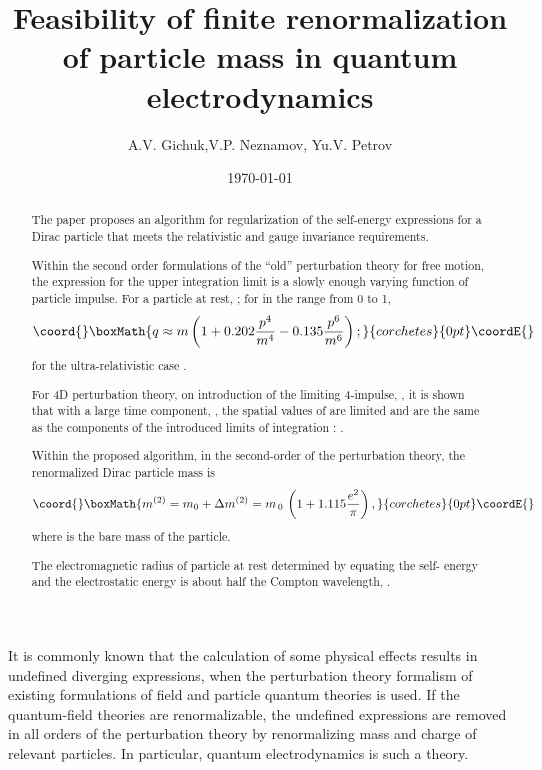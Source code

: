\documentclass[a4paper,draft,showpacs,preprint,prd,aps]{revtex4}
\begin{document}
\title{Feasibility of finite renormalization of particle mass in quantum
electrodynamics}
\author{A.V. Gichuk,V.P. Neznamov, Yu.V. Petrov}
\date{\today}
\begin{abstract}
The paper proposes an algorithm for regularization of the self-energy
expressions for a Dirac particle that meets the relativistic and gauge
invariance requirements.

Within the second order formulations of the ``old'' perturbation theory for
free
motion, the expression for the upper integration limit \coordHE{} is a slowly
enough varying function of particle impulse. For a particle at
rest, \coordHE{}; for \coordHE{} in the range from 0 to 1,
\[\coord{}\boxMath{
q \approx m\left( {1 + 0.202\frac{{p^{4}}}{{m^{4}}} -
0.135\frac{{p^{6}}}{{m^{6}}}} \right);
}{corchetes}{0pt}\coordE{}\]
for the ultra-relativistic case \coordHE{}.

For 4D perturbation theory, on introduction of the limiting 4-impulse,
\coordHE{}, it is shown that with a large time
component, \coordHE{}, the spatial values of
\coordHE{} are limited and are the same as the components of the
introduced limits of integration \coordHE{}:
\coordHE{}.

Within the proposed algorithm, in the second-order of the perturbation
theory, the renormalized Dirac particle mass is
\[\coord{}\boxMath{
m^{\left( {2} \right)} = m_{0} + \Delta m^{\left( {2} \right)} = m_{\,0}
\,\left( {1 + 1.115\frac{{e^{2}}}{{\pi} }} \right),
}{corchetes}{0pt}\coordE{}\]
where \coordHE{} is the bare mass of the particle.

The electromagnetic radius of particle at rest determined by equating the
self- energy and the electrostatic energy \coordHE{} is about half the
Compton wavelength, \coordHE{}.

\end{abstract}
\maketitle
It is commonly known that the calculation of some physical effects results
in undefined diverging expressions, when the perturbation theory formalism
of existing formulations of field and particle quantum theories is used. If
the quantum-field theories are renormalizable, the undefined expressions are
removed in all orders of the perturbation theory by renormalizing mass and
charge of relevant particles. In particular, quantum electrodynamics is such
a theory.
\end{document}

